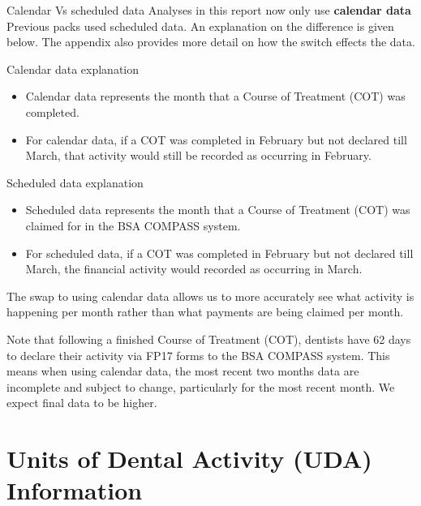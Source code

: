 \documentclass[
  8pt,
  ignorenonframetext,
  aspectratio = 169]{beamer}
\providecommand{\tightlist}{%
  \setlength{\itemsep}{0pt}\setlength{\parskip}{0pt}}
\begin{document}
\begin{frame}{Calendar Vs scheduled data}
\protect\hypertarget{calendar-vs-scheduled-data}{}
Analyses in this report now only use \textbf{calendar data} Previous
packs used scheduled data. An explanation on the difference is given
below. The appendix also provides more detail on how the switch effects
the data.

\begin{block}{Calendar data explanation}
\protect\hypertarget{calendar-data-explanation}{}
\begin{itemize}
\tightlist
\item
  Calendar data represents the month that a Course of Treatment (COT)
  was completed.
\item
  For calendar data, if a COT was completed in February but not declared
  till March, that activity would still be recorded as occurring in
  February.
\end{itemize}
\end{block}

\begin{block}{Scheduled data explanation}
\protect\hypertarget{scheduled-data-explanation}{}
\begin{itemize}
\tightlist
\item
  Scheduled data represents the month that a Course of Treatment (COT)
  was claimed for in the BSA COMPASS system.
\item
  For scheduled data, if a COT was completed in February but not
  declared till March, the financial activity would recorded as
  occurring in March.
\end{itemize}

The swap to using calendar data allows us to more accurately see what
activity is happening per month rather than what payments are being
claimed per month.

Note that following a finished Course of Treatment (COT), dentists have
62 days to declare their activity via FP17 forms to the BSA COMPASS
system. This means when using calendar data, the most recent two months
data are incomplete and subject to change, particularly for the most
recent month. We expect final data to be higher.
\end{block}
\end{frame}

\hypertarget{units-of-dental-activity-uda-information}{%
\section{Units of Dental Activity (UDA)
Information}\label{units-of-dental-activity-uda-information}}
\end{document}
